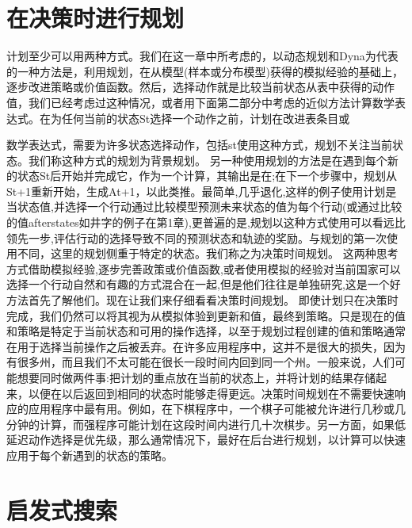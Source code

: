 \section{在决策时进行规划}

计划至少可以用两种方式。我们在这一章中所考虑的，以动态规划和Dyna为代表的一种方法是，利用规划，在从模型(样本或分布模型)获得的模拟经验的基础上，逐步改进策略或价值函数。然后，选择动作就是比较当前状态从表中获得的动作值，我们已经考虑过这种情况，或者用下面第二部分中考虑的近似方法计算数学表达式。在为任何当前的状态St选择一个动作之前，计划在改进表条目或

数学表达式，需要为许多状态选择动作，包括st使用这种方式，规划不关注当前状态。我们称这种方式的规划为背景规划。
另一种使用规划的方法是在遇到每个新的状态St后开始并完成它，作为一个计算，其输出是在;在下一个步骤中，规划从St+1重新开始，生成At+1，以此类推。最简单,几乎退化,这样的例子使用计划是当状态值,并选择一个行动通过比较模型预测未来状态的值为每个行动(或通过比较的值afterstates如井字的例子在第1章),更普遍的是,规划以这种方式使用可以看远比领先一步,评估行动的选择导致不同的预测状态和轨迹的奖励。与规划的第一次使用不同，这里的规划侧重于特定的状态。我们称之为决策时间规划。
这两种思考方式借助模拟经验,逐步完善政策或价值函数,或者使用模拟的经验对当前国家可以选择一个行动自然和有趣的方式混合在一起,但是他们往往是单独研究,这是一个好方法首先了解他们。现在让我们来仔细看看决策时间规划。
即使计划只在决策时完成，我们仍然可以将其视为从模拟体验到更新和值，最终到策略。只是现在的值和策略是特定于当前状态和可用的操作选择，以至于规划过程创建的值和策略通常在用于选择当前操作之后被丢弃。在许多应用程序中，这并不是很大的损失，因为有很多州，而且我们不太可能在很长一段时间内回到同一个州。一般来说，人们可能想要同时做两件事:把计划的重点放在当前的状态上，并将计划的结果存储起来，以便在以后返回到相同的状态时能够走得更远。决策时间规划在不需要快速响应的应用程序中最有用。例如，在下棋程序中，一个棋子可能被允许进行几秒或几分钟的计算，而强程序可能计划在这段时间内进行几十次棋步。另一方面，如果低延迟动作选择是优先级，那么通常情况下，最好在后台进行规划，以计算可以快速应用于每个新遇到的状态的策略。


\section{启发式搜索}

